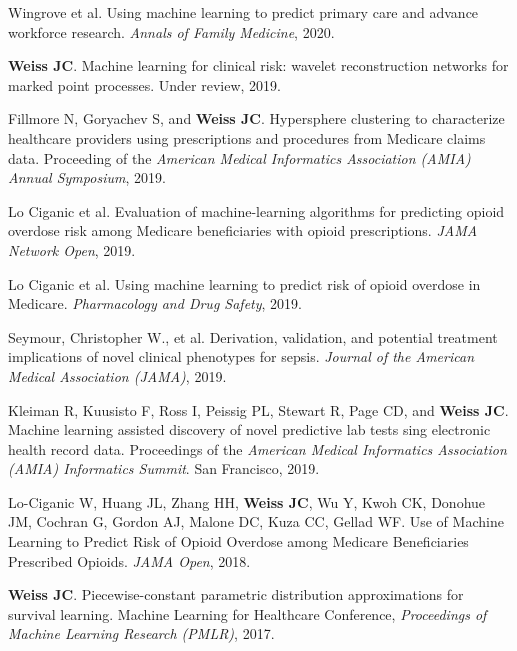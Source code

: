 \begin{bibsection}

\item  Wingrove et al.  Using machine learning to predict primary care and advance workforce research. \emph{Annals of Family Medicine}, 2020. 

\item  \textbf{Weiss JC}. Machine learning for clinical risk: wavelet reconstruction networks for marked point processes. Under review, 2019.
  
\item  Fillmore N, Goryachev S, and \textbf{Weiss JC}. Hypersphere clustering to characterize healthcare providers using prescriptions and procedures from Medicare claims data. Proceeding of the \emph{American Medical Informatics Association (AMIA) Annual Symposium}, 2019.
  
\item  Lo Ciganic et al. Evaluation of machine-learning algorithms for predicting opioid overdose risk among Medicare beneficiaries with opioid prescriptions. \emph{JAMA Network Open}, 2019.
  
\item  Lo Ciganic et al. Using machine learning to predict risk of opioid overdose in Medicare. \emph{Pharmacology and Drug Safety}, 2019. 

\item  Seymour, Christopher W., et al. Derivation, validation, and potential treatment implications of novel clinical phenotypes for sepsis. \emph{Journal of the American Medical Association (JAMA)}, 2019.

\item  Kleiman R, Kuusisto F, Ross I, Peissig PL, Stewart R, Page CD, and \textbf{Weiss JC}. Machine learning assisted discovery of novel predictive lab tests sing electronic health record data. Proceedings of the \emph{American Medical Informatics Association (AMIA) Informatics Summit}. San Francisco, 2019.

\item  Lo-Ciganic W, Huang JL, Zhang HH, \textbf{Weiss JC}, Wu Y, Kwoh CK, Donohue JM, Cochran G, Gordon AJ, Malone DC, Kuza CC, Gellad WF. Use of Machine Learning to Predict Risk of Opioid Overdose among Medicare Beneficiaries Prescribed Opioids. \emph{JAMA Open}, 2018.
  
\item  \textbf{Weiss JC}. Piecewise-constant parametric distribution approximations for survival learning. Machine Learning for Healthcare Conference, \emph{Proceedings of Machine Learning Research (PMLR)}, 2017.


\end{bibsection}
